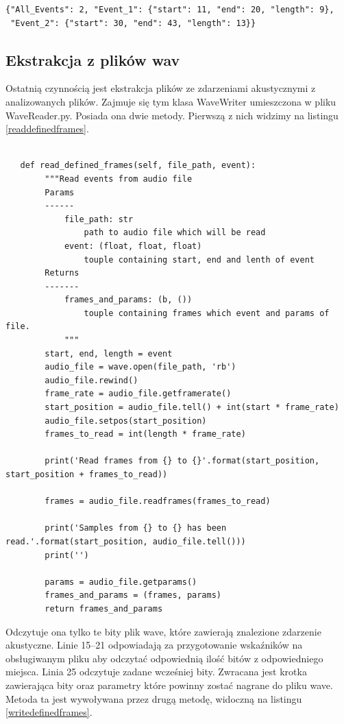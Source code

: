 \documentclass[eng,printmode]{mgr}
\begin{document}
\begin{lstlisting}[caption={Przykładowa zawartość pliku .json},captionpos=b,label={jsoncontent}] 
{"All_Events": 2, "Event_1": {"start": 11, "end": 20, "length": 9},
 "Event_2": {"start": 30, "end": 43, "length": 13}}
\end{lstlisting}

\subsection{Ekstrakcja z plików wav}
Ostatnią czynnością jest ekstrakcja plików ze zdarzeniami akustycznymi z analizowanych plików. Zajmuje się tym klasa WaveWriter umieszczona w pliku WaveReader.py. Posiada ona dwie metody. Pierwszą z nich widzimy na listingu \ref{readdefinedframes}.


\begin{minipage}{\linewidth}
\begin{lstlisting}[caption={fragment kodu źródłowego pliku WaveReader.py,\newline klasa WaveWriter, metoda read\_defined\_frames},captionpos=b,label={readdefinedframes}] 

   def read_defined_frames(self, file_path, event):
        """Read events from audio file
        Params
        ------
            file_path: str
                path to audio file which will be read
            event: (float, float, float)
                touple containing start, end and lenth of event
        Returns
        -------
            frames_and_params: (b, ())
                touple containing frames which event and params of file.
            """
        start, end, length = event
        audio_file = wave.open(file_path, 'rb')
        audio_file.rewind()
        frame_rate = audio_file.getframerate()
        start_position = audio_file.tell() + int(start * frame_rate)
        audio_file.setpos(start_position)
        frames_to_read = int(length * frame_rate)

        print('Read frames from {} to {}'.format(start_position, start_position + frames_to_read))

        frames = audio_file.readframes(frames_to_read)

        print('Samples from {} to {} has been read.'.format(start_position, audio_file.tell()))
        print('')

        params = audio_file.getparams()
        frames_and_params = (frames, params)
        return frames_and_params
\end{lstlisting}
\end{minipage}
Odczytuje ona tylko te bity plik wave, które zawierają znalezione zdarzenie akustyczne. Linie 15--21 odpowiadają za przygotowanie wskaźników na obsługiwanym pliku aby odczytać odpowiednią ilość bitów z odpowiedniego miejsca. Linia 25 odczytuje zadane wcześniej bity. Zwracana jest krotka zawierająca bity oraz parametry które powinny zostać nagrane do pliku wave. Metoda ta jest wywoływana przez drugą metodę, widoczną na listingu \ref{writedefinedframes}.
\end{document}
